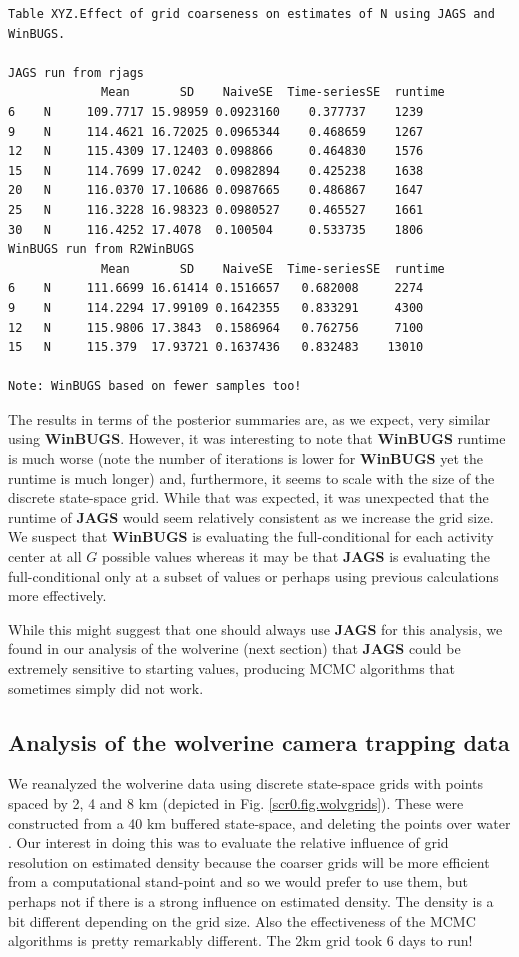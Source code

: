 {\begin{verbatim}
Table XYZ.Effect of grid coarseness on estimates of N using JAGS and
WinBUGS.

JAGS run from rjags
             Mean       SD    NaiveSE  Time-seriesSE  runtime
6    N     109.7717 15.98959 0.0923160    0.377737    1239
9    N     114.4621 16.72025 0.0965344    0.468659    1267
12   N     115.4309 17.12403 0.098866     0.464830    1576
15   N     114.7699 17.0242  0.0982894    0.425238    1638
20   N     116.0370 17.10686 0.0987665    0.486867    1647
25   N     116.3228 16.98323 0.0980527    0.465527    1661
30   N     116.4252 17.4078  0.100504     0.533735    1806
WinBUGS run from R2WinBUGS
             Mean       SD    NaiveSE  Time-seriesSE  runtime
6    N     111.6699 16.61414 0.1516657   0.682008     2274
9    N     114.2294 17.99109 0.1642355   0.833291     4300
12   N     115.9806 17.3843  0.1586964   0.762756     7100
15   N     115.379  17.93721 0.1637436   0.832483    13010

Note: WinBUGS based on fewer samples too!
\end{verbatim}

The results in terms of the posterior summaries are, as we
expect, very similar using {\bf WinBUGS}. However, it was interesting
to note that {\bf WinBUGS} runtime is much worse (note the number of
iterations is lower for {\bf WinBUGS} yet the runtime is much longer)
and, furthermore, it seems to scale with the size of the
discrete state-space grid. While that was expected, it was unexpected
that the runtime of {\bf JAGS} would seem relatively consistent
as we increase the grid size.
We suspect that {\bf WinBUGS} is evaluating the full-conditional for
each activity center at all $G$ possible values whereas it may be that
{\bf JAGS} is evaluating the full-conditional only at a subset of
values or perhaps using previous calculations more effectively.

While this might suggest that one should always use {\bf JAGS} for
this analysis, we found in our analysis of the wolverine (next
section) that {\bf JAGS} could be extremely sensitive to starting
values, producing MCMC algorithms that sometimes simply did not work.

\subsection{Analysis of the wolverine camera trapping data}


We reanalyzed the wolverine data using discrete state-space grids with
points spaced by 2, 4 and 8 km (depicted in
Fig. \ref{scr0.fig.wolvgrids}). These were constructed from a 40 km
buffered state-space, and deleting the points over water
\citep[see][]{royle_etal:2011jwm}.  Our interest in doing this was to
evaluate the relative influence of grid resolution on estimated
density because the coarser grids will be more efficient from a
computational stand-point and so we would prefer to use them, but
perhaps not if there is a strong influence on estimated density.
The density is a bit different depending on the grid size. Also the
effectiveness of the MCMC algorithms is pretty remarkably
different. The 2km grid took 6 days to run!

}
